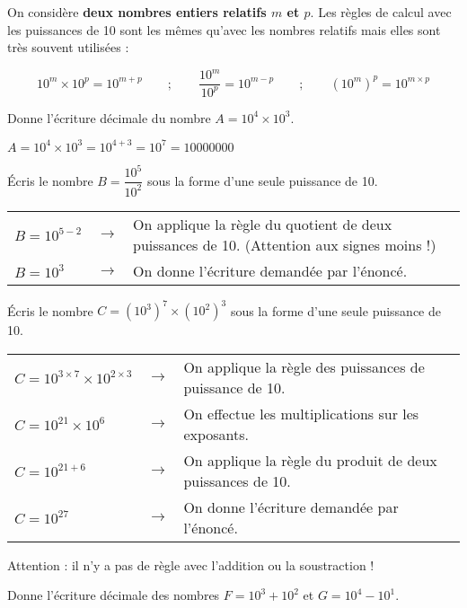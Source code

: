 On considère \textbf{deux nombres entiers relatifs $m$ et $p$}. Les règles de calcul avec les puissances de 10 sont les mêmes qu'avec les nombres relatifs mais elles sont très souvent utilisées : 

\begin{aconnaitre}
\[ 10^m \times 10^p = 10^{m + p} \qquad ; \qquad \dfrac{10^m}{10^p}=10^{m-p} \qquad ; \qquad \left(10^m\right)^p = 10^{m\times p} \]
\end{aconnaitre} 
		
\begin{exemple*1}

Donne l'écriture décimale du nombre $A = 10^4 \times 10^3$.

\correction

$A = 10^4 \times 10^3 = 10^{4+3} = 10^7 = 10 000 000$
\end{exemple*1}



\begin{exemple*1}
Écris le nombre $B =\dfrac{10^5}{10^2}$ sous la forme d'une seule puissance de 10.

\correction

\begin{tabular}{lcl}
$B = 10^{5-2}$ & $\longrightarrow$ & On applique la règle du quotient de deux puissances de 10. (Attention aux signes moins !) \\
$B = 10^3$ & $\longrightarrow$ & On donne l'écriture demandée par l'énoncé. \\
\end{tabular}
\end{exemple*1}



\begin{exemple*1}
Écris le nombre $C =\left(10^3\right)^7 \times \left(10^2\right)^3$ sous la forme d'une seule puissance de 10.

\correction

\begin{tabular}{lcl}
$C = 10^{3 \times 7} \times 10^{2 \times 3}$ & $\longrightarrow$ & On applique la règle des puissances de puissance de 10. \\
$C = 10^{21} \times 10^6$ & $\longrightarrow$ & On effectue les multiplications sur les exposants. \\
$C = 10^{21 + 6}$ & $\longrightarrow$ & On applique la règle du produit de deux puissances de 10. \\
$C = 10^{27}$ & $\longrightarrow$ & On donne l'écriture demandée par l'énoncé. \\
\end{tabular}

\end{exemple*1}



\begin{remarque}
Attention : il n'y a pas de règle avec l'addition ou la soustraction !
\end{remarque}



\begin{exemple*1}
Donne l'écriture décimale des nombres $F = 10^3 + 10^2$ et  $G = 10^4 - 10^1$.
\end{exemple*1}